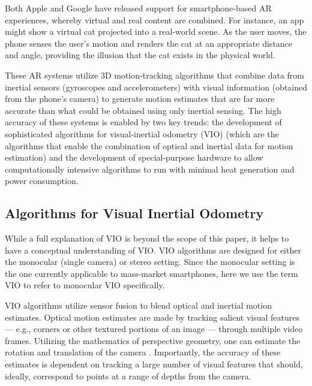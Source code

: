 \documentclass[chi]{sigchi}
\newcommand{\BVI}{B/VI\xspace}
\newcommand{\OM}{O\&M\xspace}
\begin{document}
Both Apple and Google have released support for smartphone-based AR experiences, whereby virtual and real content are combined.  For instance, an app might show a virtual cat projected into a real-world scene.  As the user moves, the phone senses the user's motion and renders the cat at an appropriate distance and angle, providing the illusion that the cat exists in the physical world.

These AR systems utilize 3D motion-tracking algorithms that combine data from inertial sensors (gyroscopes and accelerometers) with visual information (obtained from the phone's camera) to generate motion estimates that are far more accurate than what could be obtained using only inertial sensing.  The high accuracy of these systems is enabled by two key trends: the development of sophisticated algorithms for visual-inertial odometry (VIO) \cite{li2013high,leutenegger2015keyframe,bloesch2015robust,forster2014svo} (which are the algorithms that enable the combination of optical and inertial data for motion estimation) and the development of special-purpose hardware to allow computationally intensive algorithms to run with minimal heat generation and power consumption.%

\subsection{Algorithms for Visual Inertial Odometry}
While a full explanation of VIO \cite{gui2015review} is beyond the scope of this paper, it helps to have a conceptual understanding of VIO.  VIO algorithms are designed for either the monocular (single camera) or stereo setting.  Since the monocular setting is the one currently applicable to mass-market smartphones, here we use the term VIO to refer to monocular VIO specifically.

VIO algorithms utilize sensor fusion to blend optical and inertial motion estimates.  Optical motion estimates are made by tracking salient visual features --- e.g., corners or other textured portions of an image --- through multiple video frames.  Utilizing the mathematics of perspective geometry, one can estimate the rotation and translation of the camera \cite{Hartley2004}.  Importantly, the accuracy of these estimates is dependent on tracking a large number of visual features that should, ideally, correspond to points at a range of depths from the camera.%
\end{document}
